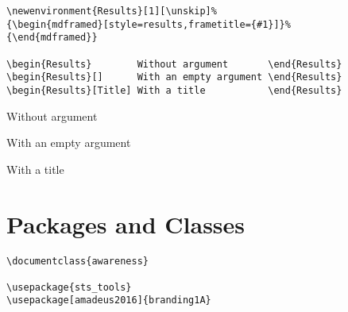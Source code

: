 \begin{LaTeXsource}[Environments]
\begin{verbatim}
\newenvironment{Results}[1][\unskip]%
{\begin{mdframed}[style=results,frametitle={#1}]}%
{\end{mdframed}}

\begin{Results}        Without argument       \end{Results}
\begin{Results}[]      With an empty argument \end{Results}
\begin{Results}[Title] With a title           \end{Results}
\end{verbatim}
\end{LaTeXsource}

\begin{Results}
Without argument
\end{Results}

\begin{Results}[]
With an empty argument
\end{Results}

\begin{Results}
With a title
\end{Results}

\section{Packages and Classes}

\begin{LaTeXsource}[Environments]
\begin{verbatim}
\documentclass{awareness}

\usepackage{sts_tools}
\usepackage[amadeus2016]{branding1A}
\end{verbatim}
\end{LaTeXsource}
